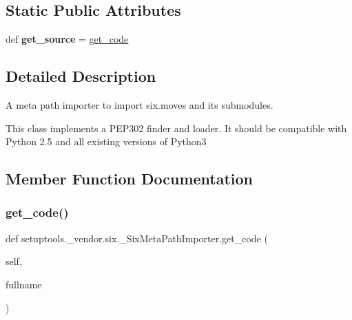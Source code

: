 \subsection*{Static Public Attributes}
\begin{DoxyCompactItemize}
\item 
\mbox{\label{classsetuptools_1_1__vendor_1_1six_1_1___six_meta_path_importer_a2ced09c8d623f75727415d6027097891}} 
def {\bfseries get\+\_\+source} = \hyperlink{classsetuptools_1_1__vendor_1_1six_1_1___six_meta_path_importer_a5cca91335317b65911692bc4dc5a9e48}{get\+\_\+code}
\end{DoxyCompactItemize}


\subsection{Detailed Description}
\begin{DoxyVerb}A meta path importer to import six.moves and its submodules.

This class implements a PEP302 finder and loader. It should be compatible
with Python 2.5 and all existing versions of Python3
\end{DoxyVerb}
 

\subsection{Member Function Documentation}
\mbox{\label{classsetuptools_1_1__vendor_1_1six_1_1___six_meta_path_importer_a5cca91335317b65911692bc4dc5a9e48}} 
\subsubsection{\texorpdfstring{get\+\_\+code()}{get\_code()}}
{\footnotesize\ttfamily def setuptools.\+\_\+vendor.\+six.\+\_\+\+Six\+Meta\+Path\+Importer.\+get\+\_\+code (\begin{DoxyParamCaption}\item[{}]{self,  }\item[{}]{fullname }\end{DoxyParamCaption})}

